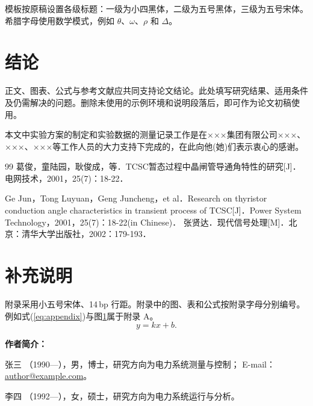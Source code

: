 \documentclass{csee}
\begin{document}
模板按原稿设置各级标题：一级为小四黑体，二级为五号黑体，三级为五号宋体。
希腊字母使用数学模式，例如 $\theta$、$\omega$、$\rho$ 和 $\Delta$。

\section{结论}
正文、图表、公式与参考文献应共同支持论文结论。此处填写研究结果、适用条件
及仍需解决的问题。删除未使用的示例环境和说明段落后，即可作为论文初稿使用。

\begin{cseeacknowledgements}
本文中实验方案的制定和实验数据的测量记录工作是在×××集团有限公司×××、
×××、×××等工作人员的大力支持下完成的，在此向他(她)们表示衷心的感谢。
\end{cseeacknowledgements}

\begin{thebibliography}{99}
  葛俊，童陆园，耿俊成，等．TCSC暂态过程中晶闸管导通角特性的研究[J]．
  电网技术，2001，25(7)：18-22．\par
  Ge Jun，Tong Luyuan，Geng Juncheng，et al．Research on thyristor conduction
  angle characteristics in transient process of TCSC[J]．Power System
  Technology，2001，25(7)：18-22(in Chinese)．
  张贤达．现代信号处理[M]．北京：清华大学出版社，2002：179-193．
\end{thebibliography}

\appendix
\section{补充说明}
附录采用小五号宋体、14\,bp 行距。附录中的图、表和公式按附录字母分别编号。
例如式(\ref{eq:appendix})与图\ref{fig:appendix}属于附录 A。
\begin{equation}
  y=kx+b.
  \label{eq:appendix}
\end{equation}
\begin{figure}[htbp]
  \centering
  \label{fig:appendix}
\end{figure}

\par\addvspace{6bp}\noindent\textbf{作者简介：}
\begin{cseebiography}{张三}
（1990—），男，博士，研究方向为电力系统测量与控制；
E-mail：\url{author@example.com}。
\end{cseebiography}
\begin{cseebiography}{李四}
（1992—），女，硕士，研究方向为电力系统运行与分析。
\end{cseebiography}
\cseeeditor
\end{document}
